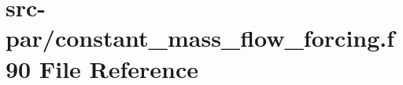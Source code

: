 \hypertarget{constant__mass__flow__forcing_8f90}{\section{src-\/par/constant\-\_\-mass\-\_\-flow\-\_\-forcing.f90 File Reference}
\label{constant__mass__flow__forcing_8f90}
}
